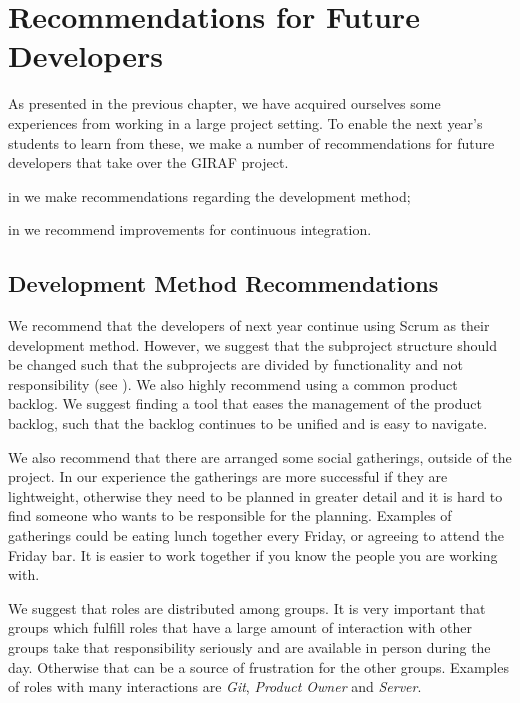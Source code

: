 \chapter{Recommendations for Future Developers}\label{chap:future_dev_recommendations}
As presented in the previous chapter, we have acquired ourselves some experiences from working in a large project setting. To enable the next year's students to learn from these, we make a number of recommendations for future developers that take over the GIRAF project.

\begin{chapterorganization}
  \item in  we make recommendations regarding the development method;
  \item in  we recommend improvements for continuous integration.
\end{chapterorganization}

\section{Development Method Recommendations}\label{sec:dev_recommentations}
We recommend that the developers of next year continue using Scrum as their development method. However, we suggest that the subproject structure should be changed such that the subprojects are divided by functionality and not responsibility (see ). We also highly recommend using a common product backlog. We suggest finding a tool that eases the management of the product backlog, such that the backlog continues to be unified and is easy to navigate.

We also recommend that there are arranged some social gatherings, outside of the project. In our experience the gatherings are more successful if they are lightweight, otherwise they need to be planned in greater detail and it is hard to find someone who wants to be responsible for the planning. Examples of gatherings could be eating lunch together every Friday, or agreeing to attend the Friday bar. It is easier to work together if you know the people you are working with.

We suggest that roles are distributed among groups. It is very important that groups which fulfill roles that have a large amount of interaction with other groups take that responsibility seriously and are available in person during the day. Otherwise that can be a source of frustration for the other groups. Examples of roles with many interactions are \emph{Git}, \emph{Product Owner} and \emph{Server}.

